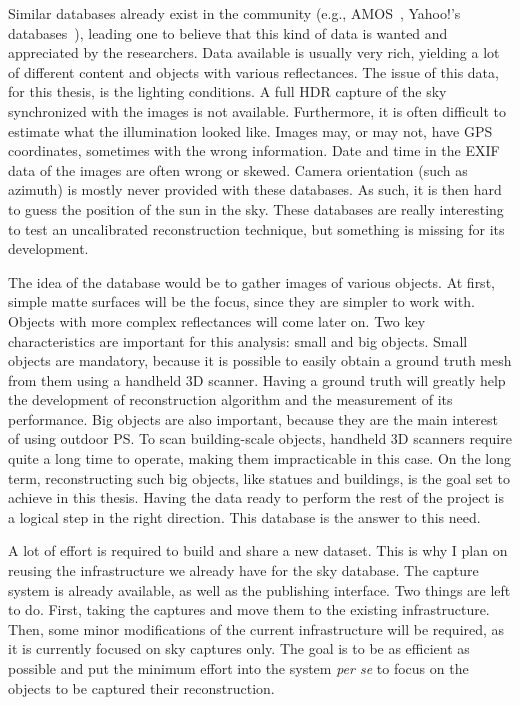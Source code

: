 Similar databases already exist in the community (e.g., AMOS~\cite{jacobs-cvpr-2007}, Yahoo!'s databases~\cite{thomee-arxiv-15}), leading one to believe that this kind of data is wanted and appreciated by the researchers. Data available is usually very rich, yielding a lot of different content and objects with various reflectances. The issue of this data, for this thesis, is the lighting conditions. A full HDR capture of the sky synchronized with the images is not available. Furthermore, it is often difficult to estimate what the illumination looked like. Images may, or may not, have GPS coordinates, sometimes with the wrong information. Date and time in the EXIF data of the images are often wrong or skewed. Camera orientation (such as azimuth) is mostly never provided with these databases. As such, it is then hard to guess the position of the sun in the sky. These databases are really interesting to test an uncalibrated reconstruction technique, but something is missing for its development.

The idea of the database would be to gather images of various objects. At first, simple matte surfaces will be the focus, since they are simpler to work with. Objects with more complex reflectances will come later on. Two key characteristics are important for this analysis: small and big objects. Small objects are mandatory, because it is possible to easily obtain a ground truth mesh from them using a handheld 3D scanner. Having a ground truth will greatly help the development of reconstruction algorithm and the measurement of its performance. Big objects are also important, because they are the main interest of using outdoor PS. To scan building-scale objects, handheld 3D scanners require quite a long time to operate, making them impracticable in this case. On the long term, reconstructing such big objects, like statues and buildings, is the goal set to achieve in this thesis. Having the data ready to perform the rest of the project is a logical step in the right direction. This database is the answer to this need.

A lot of effort is required to build and share a new dataset. This is why I plan on reusing the infrastructure we already have for the sky database. The capture system is already available, as well as the publishing interface. Two things are left to do. First, taking the captures and move them to the existing infrastructure. Then, some minor modifications of the current infrastructure will be required, as it is currently focused on sky captures only. The goal is to be as efficient as possible and put the minimum effort into the system \emph{per se} to focus on the objects to be captured their reconstruction.

